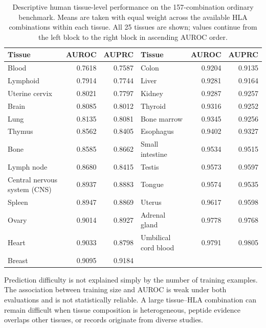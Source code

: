 \begin{table}[!b]
\centering
\caption{Descriptive human tissue-level performance on the 157-combination ordinary benchmark. Means are taken with equal weight across the available HLA combinations within each tissue. All 25 tissues are shown; values continue from the left block to the right block in ascending AUROC order.}
\label{tab:human-tissue-extremes}
\footnotesize
\setlength{\tabcolsep}{2pt}
\begin{tabularx}{\textwidth}{@{}>{\raggedright\arraybackslash}Xrr@{\hspace{1.2cm}}>{\raggedright\arraybackslash}Xrr@{}}
\toprule
Tissue & AUROC & AUPRC & Tissue & AUROC & AUPRC \\
\midrule
Blood & 0.7618 & 0.7587 & Colon & 0.9204 & 0.9135 \\
Lymphoid & 0.7914 & 0.7744 & Liver & 0.9281 & 0.9164 \\
Uterine cervix & 0.8021 & 0.7797 & Kidney & 0.9287 & 0.9257 \\
Brain & 0.8085 & 0.8012 & Thyroid & 0.9316 & 0.9252 \\
Lung & 0.8135 & 0.8081 & Bone marrow & 0.9345 & 0.9256 \\
Thymus & 0.8562 & 0.8405 & Esophagus & 0.9402 & 0.9327 \\
Bone & 0.8585 & 0.8662 & Small intestine & 0.9534 & 0.9515 \\
Lymph node & 0.8680 & 0.8415 & Testis & 0.9573 & 0.9597 \\
Central nervous system (CNS) & 0.8937 & 0.8883 & Tongue & 0.9574 & 0.9535 \\
Spleen & 0.8947 & 0.8869 & Uterus & 0.9617 & 0.9598 \\
Ovary & 0.9014 & 0.8927 & Adrenal gland & 0.9778 & 0.9768 \\
Heart & 0.9033 & 0.8798 & Umbilical cord blood & 0.9791 & 0.9805 \\
Breast & 0.9095 & 0.9184 & & & \\
\bottomrule
\end{tabularx}
\end{table}

Prediction difficulty is not explained simply by the number of training examples. The association between training size and AUROC is weak under both evaluations and is not statistically reliable. A large tissue--HLA combination can remain difficult when tissue composition is heterogeneous, peptide evidence overlaps other tissues, or records originate from diverse studies.

